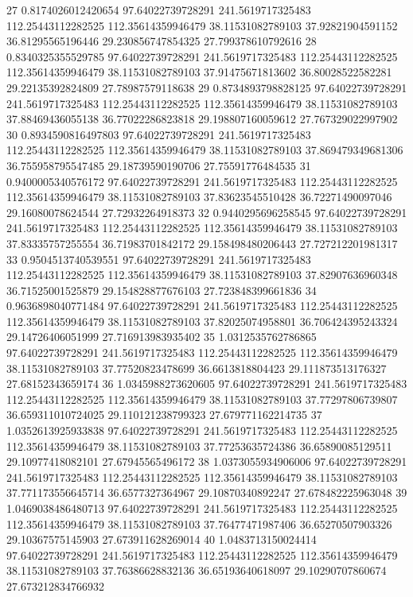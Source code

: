{27 0.8174026012420654 97.64022739728291 241.5619717325483 112.25443112282525 112.35614359946479 38.11531082789103 37.92821904591152 36.81295565196446 29.230856747854325 27.799378610792616
28 0.8340325355529785 97.64022739728291 241.5619717325483 112.25443112282525 112.35614359946479 38.11531082789103 37.91475671813602 36.80028522582281 29.22135392824809 27.78987579118638
29 0.8734893798828125 97.64022739728291 241.5619717325483 112.25443112282525 112.35614359946479 38.11531082789103 37.88469436055138 36.77022286823818 29.198807160059612 27.767329022997902
30 0.8934590816497803 97.64022739728291 241.5619717325483 112.25443112282525 112.35614359946479 38.11531082789103 37.869479349681306 36.755958795547485 29.18739590190706 27.75591776484535
31 0.9400005340576172 97.64022739728291 241.5619717325483 112.25443112282525 112.35614359946479 38.11531082789103 37.83623545510428 36.72271490097046 29.16080078624544 27.72932264918373
32 0.9440295696258545 97.64022739728291 241.5619717325483 112.25443112282525 112.35614359946479 38.11531082789103 37.83335757255554 36.71983701842172 29.158498480206443 27.727212201981317
33 0.9504513740539551 97.64022739728291 241.5619717325483 112.25443112282525 112.35614359946479 38.11531082789103 37.82907636960348 36.71525001525879 29.154828877676103 27.723848399661836
34 0.9636898040771484 97.64022739728291 241.5619717325483 112.25443112282525 112.35614359946479 38.11531082789103 37.82025074958801 36.706424395243324 29.14726406051999 27.716913983935402
35 1.0312535762786865 97.64022739728291 241.5619717325483 112.25443112282525 112.35614359946479 38.11531082789103 37.77520823478699 36.6613818804423 29.111873513176327 27.68152343659174
36 1.0345988273620605 97.64022739728291 241.5619717325483 112.25443112282525 112.35614359946479 38.11531082789103 37.77297806739807 36.659311010724025 29.110121238799323 27.679771162214735
37 1.0352613925933838 97.64022739728291 241.5619717325483 112.25443112282525 112.35614359946479 38.11531082789103 37.77253635724386 36.65890085129511 29.10977418082101 27.67945565496172
38 1.0373055934906006 97.64022739728291 241.5619717325483 112.25443112282525 112.35614359946479 38.11531082789103 37.771173556645714 36.6577327364967 29.10870340892247 27.678482225963048
39 1.0469038486480713 97.64022739728291 241.5619717325483 112.25443112282525 112.35614359946479 38.11531082789103 37.76477471987406 36.65270507903326 29.10367575145903 27.673911628269014
40 1.0483713150024414 97.64022739728291 241.5619717325483 112.25443112282525 112.35614359946479 38.11531082789103 37.76386628832136 36.65193640618097 29.10290707860674 27.673212834766932
}
